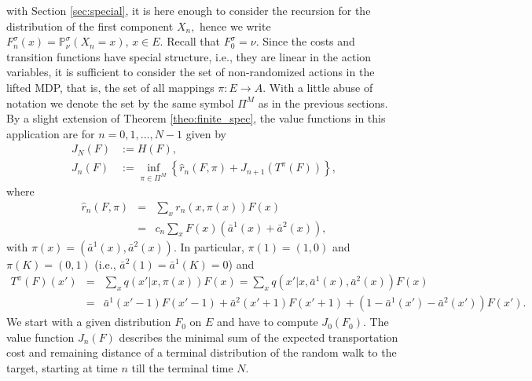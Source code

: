 \documentclass[reqno, 12pt]{amsart}%
\newcommand{\PP}{\mathbb{P}}
\theoremstyle{definition}
\numberwithin{equation}{section} \numberwithin{theorem}{section}
\begin{document}
with Section \ref{sec:special}, it is here 
enough to consider the recursion for the 
distribution of the first component $X_n, $ 
hence we write 
$F_n^\sigma(x)=\PP^\sigma_\nu(X_n=x),\, x\in E.$   Recall that $F_0^\sigma=\nu.$
Since the costs and transition functions have special structure, i.e., they are linear in the action variables, it is sufficient to consider
the set of non-randomized actions in the lifted 
MDP, that is, the set of all mappings 
$\pi :E\to A.$ With a little abuse of notation we
denote the set by the same symbol $\Pi^M$ as in the previous sections.
By a slight extension of Theorem \ref{theo:finite_spec}, the value functions in this application are for $n=0,1,\ldots ,N-1$ given by
\begin{align}
  \nonumber  J_N(F) & := H(F),\\
    J_n(F) &:=  \inf_{\pi\in \Pi^M} \left\{ \hat r_n (F,\pi)+ J_{n+1}(T^\pi(F)) \right\}, \label{eq:OE2}
\end{align}
where 
\begin{eqnarray*}
    \hat r_n(F,\pi) &=& \sum_x  r_n(x,\pi(x))  F(x) \\
    &=& c_n \sum_x F(x) (\bar{a}^1(x)+\bar{a}^2(x)),
\end{eqnarray*}
with $\pi(x)=(\bar{a}^1(x),\bar{a}^2(x)).$ In particular, $\pi(1)=(1,0)$ and $\pi(K)=(0,1)$ (i.e., $\bar{a}^2(1)=\bar{a}^1(K)=0$) and
\begin{eqnarray*}
T^\pi (F)(x') &=&
\sum_x q(x'|x,\pi(x)) F(x)=
\sum_x q(x'|x,\bar a^1(x),\bar a^2(x)) F(x)\\
&=& \bar{a}^1(x'-1) F(x'-1) + \bar{a}^2(x'+1) F(x'+1) + (1- \bar{a}^1(x')-\bar{a}^2(x')) F(x').
\end{eqnarray*} 
 We start with a given 
distribution $F_0$ on $E$ and have to compute 
$J_0(F_0)$.  The value function $J_n(F)$ describes the minimal sum of  the expected transportation cost and remaining distance of a  terminal distribution of the random walk to the target, starting at time $n$ till the terminal time $N.$
\end{document}
